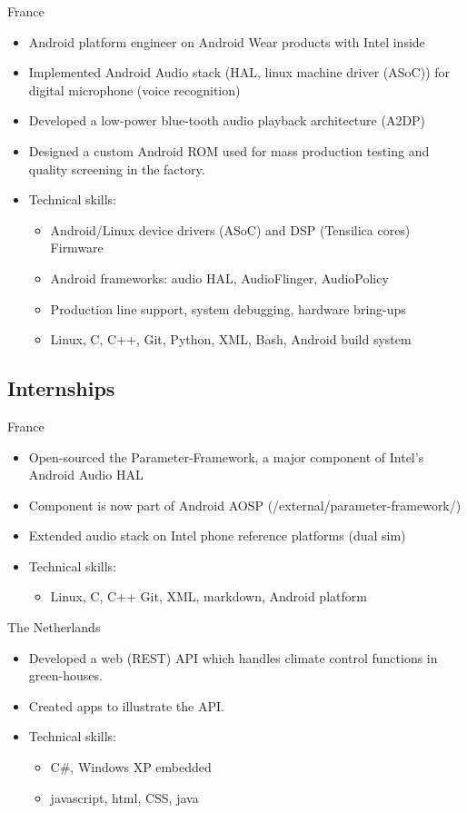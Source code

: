 \documentclass[a4paper,10pt,sans,colorlinks=true]{moderncv}
\begin{document}
{}{France}
{
    \begin{itemize}
    \item Android platform engineer on Android Wear products with Intel inside
    \item Implemented Android Audio stack (HAL, linux machine driver (ASoC)) for digital microphone (voice recognition)
    \item Developed a low-power blue-tooth audio playback architecture (A2DP)
    \item Designed a custom Android ROM used for mass production testing and quality screening in the factory.
    \item Technical skills:
      \begin{itemize}
        \item Android/Linux device drivers (ASoC) and DSP (Tensilica cores) Firmware
        \item Android frameworks: audio HAL, AudioFlinger, AudioPolicy
        \item Production line support, system debugging, hardware bring-ups
        \item Linux, C, C++, Git, Python, XML, Bash, Android build system
      \end{itemize}
    \end{itemize}
}

\subsection{Internships}
{}{France}
{
  \begin{itemize}
    \item Open-sourced the Parameter-Framework, a major component of Intel's Android Audio HAL
    \item Component is now part of Android AOSP (/external/parameter-framework/)
    \item Extended audio stack on Intel phone reference platforms (dual sim)
    \item Technical skills:
    \begin{itemize}
      \item Linux, C, C++ Git, XML, markdown, Android platform
    \end{itemize}
  \end{itemize}
}

{}{The Netherlands}
{
  \begin{itemize}
    \item Developed a web (REST) API which handles climate control functions in green-houses.
    \item Created apps to illustrate the API.
    \item Technical skills:
    \begin{itemize}
      \item C\#, Windows XP embedded
      \item javascript, html, CSS, java
    \end{itemize}
  \end{itemize}
}
\end{document}
